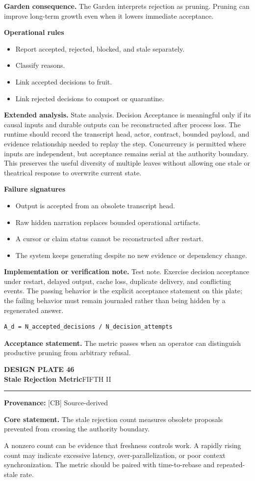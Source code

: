 \documentclass[10pt,letterpaper,oneside]{article}
\newcommand{\prov}[1]{\textcolor{gardenBlue}{\sffamily\footnotesize\textbf{Provenance:} #1}}
\newcommand{\platetitle}[3]{%
  \begin{minipage}[t][0.54in][t]{\textwidth}
  {\sffamily\bfseries\color{gardenDeep}\fontsize{9}{10}\selectfont DESIGN PLATE #1}\\[-1pt]
  {\sffamily\bfseries\color{gardenInk}\fontsize{16.5}{18}\selectfont #2}\hfill{\sffamily\color{gardenGreen}\large #3}
  \end{minipage}\vspace{-2pt}\hrule\vspace{5pt}}
\begin{document}
\textbf{Garden consequence.} The Garden interprets rejection as pruning. Pruning can improve long-term growth even when it lowers immediate acceptance.

\textbf{Operational rules}
\begin{itemize}
\item Report accepted, rejected, blocked, and stale separately.
\item Classify reasons.
\item Link accepted decisions to fruit.
\item Link rejected decisions to compost or quarantine.
\end{itemize}
\textbf{Extended analysis.} State analysis. Decision Acceptance is meaningful only if its causal inputs and durable outputs can be reconstructed after process loss. The runtime should record the transcript head, actor, contract, bounded payload, and evidence relationship needed to replay the step. Concurrency is permitted where inputs are independent, but acceptance remains serial at the authority boundary. This preserves the useful diversity of multiple leaves without allowing one stale or theatrical response to overwrite current state.

\textbf{Failure signatures}
\begin{itemize}
\item Output is accepted from an obsolete transcript head.
\item Raw hidden narration replaces bounded operational artifacts.
\item A cursor or claim status cannot be reconstructed after restart.
\item The system keeps generating despite no new evidence or dependency change.
\end{itemize}
\textbf{Implementation or verification note.} Test note. Exercise decision acceptance under restart, delayed output, cache loss, duplicate delivery, and conflicting events. The passing behavior is the explicit acceptance statement on this plate; the failing behavior must remain journaled rather than being hidden by a regenerated answer.

\begin{lstlisting}
A_d = N_accepted_decisions / N_decision_attempts
\end{lstlisting}
\begin{acceptbox}
\textbf{Acceptance statement.} The metric passes when an operator can distinguish productive pruning from arbitrary refusal.
\end{acceptbox}
\newpage
\platetitle{46}{Stale Rejection Metric}{FIFTH II}
\prov{[CB] Source-derived}
\fontsize{8.85}{10.45}\selectfont
\begin{corebox}
\textbf{Core statement.} The stale rejection count measures obsolete proposals prevented from crossing the authority boundary.
\end{corebox}
A nonzero count can be evidence that freshness controls work. A rapidly rising count may indicate excessive latency, over-parallelization, or poor context synchronization. The metric should be paired with time-to-rebase and repeated-stale rate.
\end{document}
